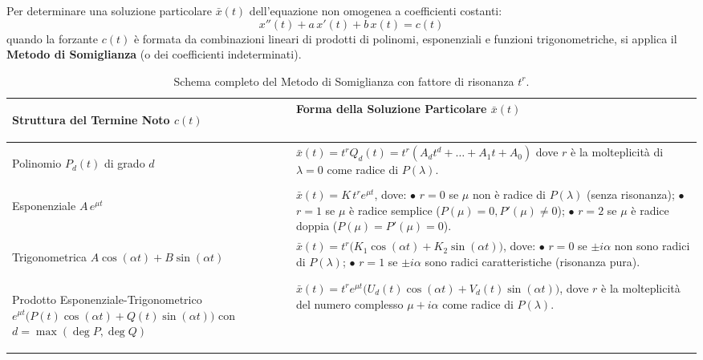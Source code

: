 Per determinare una soluzione particolare $\bar{x}(t)$ dell'equazione non omogenea a coefficienti costanti:
\begin{equation}
    x''(t) + a\, x'(t) + b\, x(t) = c(t)
\end{equation}
quando la forzante $c(t)$ è formata da combinazioni lineari di prodotti di polinomi, esponenziali e funzioni trigonometriche, si applica il \textbf{Metodo di Somiglianza} (o dei coefficienti indeterminati).

\begin{table}[htbp]
\centering
\small
\renewcommand{\arraystretch}{1.45}
\begin{tabularx}{\textwidth}{>{\bfseries\raggedright\arraybackslash}p{5.5cm} >{\raggedright\arraybackslash}X}
\toprule
\textcolor{navyblue}{Struttura del Termine Noto $c(t)$} & \textcolor{navyblue}{Forma della Soluzione Particolare $\bar{x}(t)$} \\
\midrule
Polinomio $P_d(t)$ di grado $d$ & 
$\bar{x}(t) = t^r Q_d(t) = t^r (A_d t^d + \dots + A_1 t + A_0)$ \newline
dove $r$ è la molteplicità di $\lambda = 0$ come radice di $P(\lambda)$. \\
\midrule
Esponenziale $A\, e^{\mu t}$ & 
$\bar{x}(t) = K\, t^r e^{\mu t}$, dove: \newline
$\bullet$ $r = 0$ se $\mu$ non è radice di $P(\lambda)$ (senza risonanza); \newline
$\bullet$ $r = 1$ se $\mu$ è radice semplice ($P(\mu) = 0, P'(\mu) \neq 0$); \newline
$\bullet$ $r = 2$ se $\mu$ è radice doppia ($P(\mu) = P'(\mu) = 0$). \\
\midrule
Trigonometrica \newline $A\cos(\alpha t) + B\sin(\alpha t)$ & 
$\bar{x}(t) = t^r \big( K_1 \cos(\alpha t) + K_2 \sin(\alpha t) \big)$, dove: \newline
$\bullet$ $r = 0$ se $\pm i\alpha$ non sono radici di $P(\lambda)$; \newline
$\bullet$ $r = 1$ se $\pm i\alpha$ sono radici caratteristiche (risonanza pura). \\
\midrule
Prodotto Esponenziale-Trigonometrico \newline $e^{\mu t}\big( P(t)\cos(\alpha t) + Q(t)\sin(\alpha t) \big)$ \newline con $d = \max(\deg P, \deg Q)$ & 
$\bar{x}(t) = t^r e^{\mu t} \big( U_d(t) \cos(\alpha t) + V_d(t) \sin(\alpha t) \big)$, dove $r$ è la molteplicità del numero complesso $\mu + i\alpha$ come radice di $P(\lambda)$. \\
\bottomrule
\end{tabularx}
\caption{Schema completo del Metodo di Somiglianza con fattore di risonanza $t^r$.}
\label{tab:somiglianza}
\end{table}

